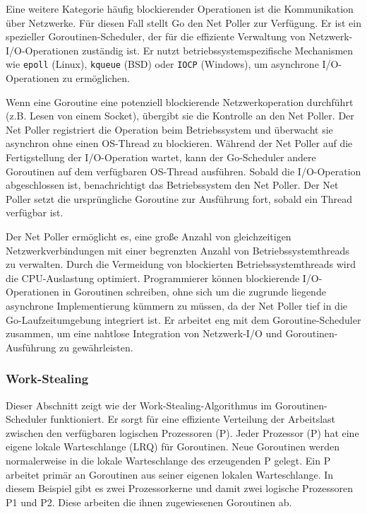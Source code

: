 \documentclass[fontsize=12pt,paper=a4,twoside=semi,parskip=half-,headsepline,headinclude]{scrreprt}
\begin{document}
Eine weitere Kategorie häufig blockierender Operationen ist die Kommunikation über Netzwerke. Für diesen Fall stellt Go den Net Poller\cite{netpoll2024} zur Verfügung. Er ist ein spezieller Goroutinen-Scheduler, der für die effiziente Verwaltung von Netzwerk-I/O-Operationen zuständig ist. Er nutzt betriebssystemspezifische Mechanismen wie \texttt{epoll} (Linux), \texttt{kqueue} (BSD) oder \texttt{IOCP} (Windows), um asynchrone I/O-Operationen zu ermöglichen.

Wenn eine Goroutine eine potenziell blockierende Netzwerkoperation durchführt (z.B. Lesen von einem Socket), übergibt sie die Kontrolle an den Net Poller. Der Net Poller registriert die Operation beim Betriebssystem und überwacht sie asynchron ohne einen OS-Thread zu blockieren. Während der Net Poller auf die Fertigstellung der I/O-Operation wartet, kann der Go-Scheduler andere Goroutinen auf dem verfügbaren OS-Thread ausführen. Sobald die I/O-Operation abgeschlossen ist, benachrichtigt das Betriebssystem den Net Poller. Der Net Poller setzt die ursprüngliche Goroutine zur Ausführung fort, sobald ein Thread verfügbar ist.

Der Net Poller ermöglicht es, eine große Anzahl von gleichzeitigen Netzwerkverbindungen mit einer begrenzten Anzahl von Betriebssystemthreads zu verwalten. Durch die Vermeidung von blockierten Betriebssystemthreads wird die CPU-Auslastung optimiert. Programmierer können blockierende I/O-Operationen in Goroutinen schreiben, ohne sich um die zugrunde liegende asynchrone Implementierung kümmern zu müssen, da der Net Poller tief in die Go-Laufzeitumgebung integriert ist. Er arbeitet eng mit dem Goroutine-Scheduler zusammen, um eine nahtlose Integration von Netzwerk-I/O und Goroutinen-Ausführung zu gewährleisten. 

\subsubsection{Work-Stealing}
\label{subsubsec:workstealing}

Dieser Abschnitt zeigt wie der Work-Stealing-Algorithmus im Goroutinen-Scheduler funktioniert. Er sorgt für eine effiziente Verteilung der Arbeitslast zwischen den verfügbaren logischen Prozessoren (P). Jeder Prozessor (P) hat eine eigene lokale Warteschlange (LRQ) für Goroutinen. Neue Goroutinen werden normalerweise in die lokale Warteschlange des erzeugenden P gelegt. Ein P arbeitet primär an Goroutinen aus seiner eigenen lokalen Warteschlange. In diesem Beispiel gibt es zwei Prozessorkerne und damit zwei logische Prozessoren P1 und P2. Diese arbeiten die ihnen zugewiesenen Goroutinen ab.
\end{document}
